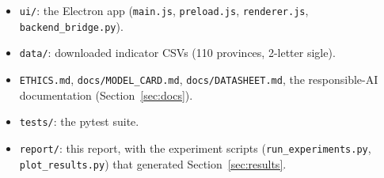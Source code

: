 \documentclass[11pt,a4paper]{article}
\newcommand{\code}[1]{\texttt{#1}}
\begin{document}
\begin{itemize}
\begin{itemize}
\begin{itemize}
            that re-derives the twin's structure from the data, scores it against
            the hand-written graph, and produces the reviewed edge signs the
            simulator consumes (Section~\ref{sec:datareview});
            \item \code{cli.py}: training and batch simulation.
        \end{itemize}
    \end{itemize}
    \item \code{ui/}: the Electron app (\code{main.js}, \code{preload.js},
    \code{renderer.js}, \code{backend\_bridge.py}).
    \item \code{data/}: downloaded indicator CSVs (110 provinces, 2-letter
    sigle).
    \item \code{ETHICS.md}, \code{docs/MODEL\_CARD.md}, \code{docs/DATASHEET.md},
the responsible-AI documentation (Section~\ref{sec:docs}).
    \item \code{tests/}: the pytest suite.
    \item \code{report/}: this report, with the experiment scripts
    (\code{run\_\allowbreak experiments.py}, \code{plot\_\allowbreak results.py}) that generated
    Section~\ref{sec:results}.
\end{itemize}
\end{document}
